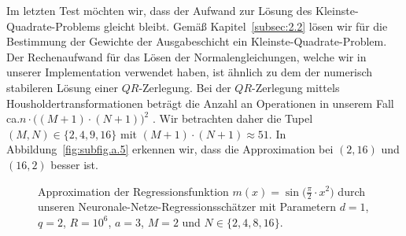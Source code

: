 Im letzten Test möchten wir, dass der Aufwand zur Lösung des Kleinste-Quadrate-Problems gleicht bleibt. Gemäß Kapitel~\ref{subsec:2.2} lösen wir für die Bestimmung der Gewichte der Ausgabeschicht ein Kleinste-Quadrate-Problem. Der Rechenaufwand für das Lösen der Normalengleichungen, welche wir in unserer Implementation verwendet haben, ist ähnlich zu dem der numerisch stabileren Lösung einer $QR$-Zerlegung. Bei der $QR$-Zerlegung mittels Housholdertransformationen beträgt die Anzahl an Operationen in unserem Fall ca.\@ $n \cdot \big((M + 1)\cdot(N + 1)\big)^2$ \cite[Kapitel 4, Seite 130]{reusken2008}. Wir betrachten daher die Tupel $(M, N) \in \{2,4,9,16\}$ mit $(M + 1)\cdot(N + 1) \approx 51$. In Abbildung~\ref{fig:subfig.a.5} erkennen wir, dass die Approximation bei $(2,16)$ und $(16,2)$ besser ist.

\begin{figure}
    \begin{subfigure}[b]{0.5\textwidth}
        \centering
        \scalebox{0.9}{
          }
        \label{fig:subfig1n2m2}
    \end{subfigure}
    \begin{subfigure}[b]{0.5\textwidth}
    \centering
    \scalebox{0.9}{
           }
        \label{fig:subfig1n4m2}
    \end{subfigure}
       \hspace{0.1cm}
    \begin{subfigure}[b]{0.5\textwidth}
    \centering
    \scalebox{0.9}{
	}
        \label{fig:subfig1n8m2}
    \end{subfigure}
    \begin{subfigure}[b]{0.5\textwidth}
    \centering
     \scalebox{0.9}{
           }
        \label{fig:subfig1n16m2}
    \end{subfigure}
    \begin{subfigure}[b]{1\textwidth}
        \centering
    \end{subfigure}
    \caption{Approximation der Regressionsfunktion $m(x) = \sin\big(\frac{\pi}{2} \cdot x^2\big)$ durch unseren Neuronale-Netze-Regressionsschätzer mit Parametern $d = 1$, $q = 2$, $R = 10^6$, $a = 3$, $M = 2$ und $N \in \{2,4,8,16\}$.}
    \label{fig:subfig.a.1}
\end{figure}

